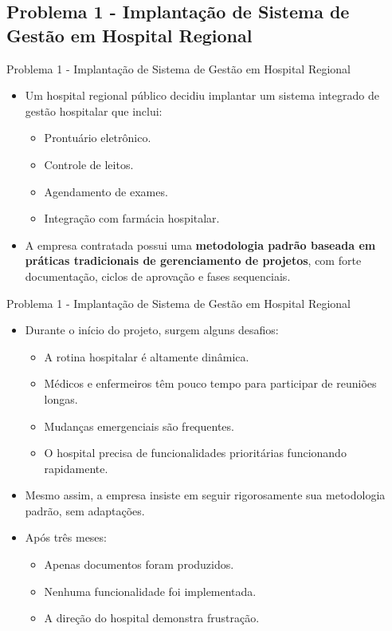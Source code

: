 \documentclass{beamer}
\begin{document}
\subsection{Problema 1 - Implantação de Sistema de Gestão em Hospital Regional}

\begin{frame}{Problema 1 - Implantação de Sistema de Gestão em Hospital Regional}
	\begin{itemize}
		\justifying
		\item Um hospital regional público decidiu implantar um sistema integrado de gestão hospitalar que inclui:
			\begin{itemize}
				\justifying
				\item Prontuário eletrônico.
				\item Controle de leitos.
				\item Agendamento de exames.
				\item Integração com farmácia hospitalar.
			\end{itemize}
		\item A empresa contratada possui uma \textbf{metodologia padrão baseada em práticas tradicionais de gerenciamento de projetos}, com forte documentação, ciclos de aprovação e fases sequenciais.
	\end{itemize}
\end{frame}

\begin{frame}{Problema 1 - Implantação de Sistema de Gestão em Hospital Regional}
	\begin{itemize}
		\justifying
		\item Durante o início do projeto, surgem alguns desafios:
			\begin{itemize}
				\justifying
				\item A rotina hospitalar é altamente dinâmica.
				\item Médicos e enfermeiros têm pouco tempo para participar de reuniões longas.
				\item Mudanças emergenciais são frequentes.
				\item O hospital precisa de funcionalidades prioritárias funcionando rapidamente.
			\end{itemize}
		\item Mesmo assim, a empresa insiste em seguir rigorosamente sua metodologia padrão, sem adaptações.
		\item Após três meses:
			\begin{itemize}
				\item Apenas documentos foram produzidos.
				\item Nenhuma funcionalidade foi implementada.
				\item A direção do hospital demonstra frustração.
			\end{itemize}
	\end{itemize}
\end{frame}
\end{document}
